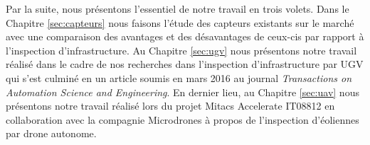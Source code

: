 Par la suite, nous présentons l'essentiel de notre travail en trois volets. Dans le Chapitre \ref{sec:capteurs} nous faisons l'étude des capteurs existants sur le marché avec une comparaison des avantages et des désavantages de ceux-cis par rapport à l'inspection d'infrastructure. Au Chapitre \ref{sec:ugv} nous présentons notre travail réalisé dans le cadre de nos recherches dans l'inspection d'infrastructure par UGV qui s'est culminé en un article soumis en mars 2016 au journal \textit{Transactions on Automation Science and Engineering}. En dernier lieu, au Chapitre \ref{sec:uav} nous présentons notre travail réalisé lors du projet Mitacs Accelerate IT08812 en collaboration avec la compagnie Microdrones à propos de l'inspection d'éoliennes par drone autonome.


